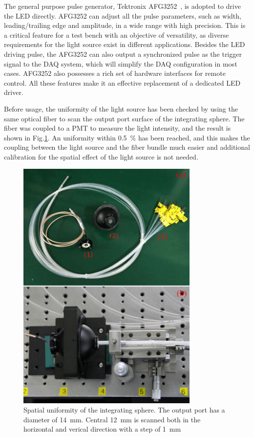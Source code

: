 \documentclass[preprint, times]{elsarticle}
\begin{document}
The general purpose pulse generator, Tektronix AFG3252~\cite{afg3252}, is adopted to drive the LED directly.
AFG3252 can adjust all the pulse parameters, such as width, leading/trailing edge and amplitude, in a wide range with high precision. This is a critical feature for a test bench with an objective of versatility, as diverse requirements for the light source exist in different applications. 
Besides the LED driving pulse, the AFG3252 can also output a synchronized pulse as the trigger signal to the DAQ system, which will simplify the DAQ configuration in most cases. 
AFG3252 also possesses a rich set of hardware interfaces for remote control. All these features make it an effective replacement of a dedicated LED driver. 

Before usage, the uniformity of the light source has been checked by using the same optical fiber to scan the output port surface of the integrating sphere. The fiber was coupled to a PMT to measure the light intensity, and the result is shown in Fig.\ref{fig:FIG3}. An uniformity within \textpm\SI{0.5}{\percent} has been reached, and this makes the coupling between the light source and the fiber bundle much easier and additional calibration for the spatial effect of the light source is not needed. 

\begin{figure}
 \centering
 \includegraphics[width=90mm]{FIG3}
\caption{Spatial uniformity of the integrating sphere.
The output port has a diameter of \SI{14}{\milli\meter}.
Central \SI{12}{\milli\meter} is scanned both in the horizontal and verical direction with a step of \SI{1}{\milli\meter}}
\label{fig:FIG3}
\end{figure} 
\end{document}
